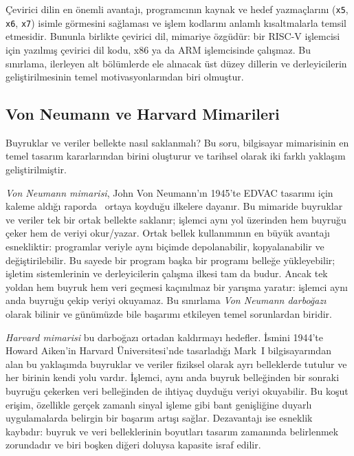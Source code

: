Çevirici dilin en önemli avantajı, programcının kaynak ve hedef yazmaçlarını (\texttt{x5}, \texttt{x6}, \texttt{x7}) isimle görmesini sağlaması ve işlem kodlarını anlamlı kısaltmalarla temsil etmesidir. Bununla birlikte çevirici dil, mimariye özgüdür: bir RISC-V işlemcisi için yazılmış çevirici dil kodu, x86 ya da ARM işlemcisinde çalışmaz. Bu sınırlama, ilerleyen alt bölümlerde ele alınacak üst düzey dillerin ve derleyicilerin geliştirilmesinin temel motivasyonlarından biri olmuştur.

\subsection{Von Neumann ve Harvard Mimarileri}
\label{subsec:vonneumann-harvard}

Buyruklar ve veriler bellekte nasıl saklanmalı? Bu soru, bilgisayar mimarisinin en temel tasarım kararlarından birini oluşturur ve tarihsel olarak iki farklı yaklaşım geliştirilmiştir.

\emph{Von Neumann mimarisi}, John Von Neumann'ın 1945'te EDVAC tasarımı için kaleme aldığı raporda~\cite{vonneumann1945} ortaya koyduğu ilkelere dayanır. Bu mimaride buyruklar ve veriler tek bir ortak bellekte saklanır; işlemci aynı yol üzerinden hem buyruğu çeker hem de veriyi okur/yazar. Ortak bellek kullanımının en büyük avantajı esnekliktir: programlar veriyle aynı biçimde depolanabilir, kopyalanabilir ve değiştirilebilir. Bu sayede bir program başka bir programı belleğe yükleyebilir; işletim sistemlerinin ve derleyicilerin çalışma ilkesi tam da budur. Ancak tek yoldan hem buyruk hem veri geçmesi kaçınılmaz bir yarışma yaratır: işlemci aynı anda buyruğu çekip veriyi okuyamaz. Bu sınırlama \emph{Von Neumann darboğazı} olarak bilinir ve günümüzde bile başarımı etkileyen temel sorunlardan biridir.

\emph{Harvard mimarisi} bu darboğazı ortadan kaldırmayı hedefler. İsmini 1944'te Howard Aiken'in Harvard Üniversitesi'nde tasarladığı Mark~I bilgisayarından alan bu yaklaşımda buyruklar ve veriler fiziksel olarak ayrı belleklerde tutulur ve her birinin kendi yolu vardır. İşlemci, aynı anda buyruk belleğinden bir sonraki buyruğu çekerken veri belleğinden de ihtiyaç duyduğu veriyi okuyabilir. Bu koşut erişim, özellikle gerçek zamanlı sinyal işleme gibi bant genişliğine duyarlı uygulamalarda belirgin bir başarım artışı sağlar. Dezavantajı ise esneklik kaybıdır: buyruk ve veri belleklerinin boyutları tasarım zamanında belirlenmek zorundadır ve biri boşken diğeri doluysa kapasite israf edilir.

